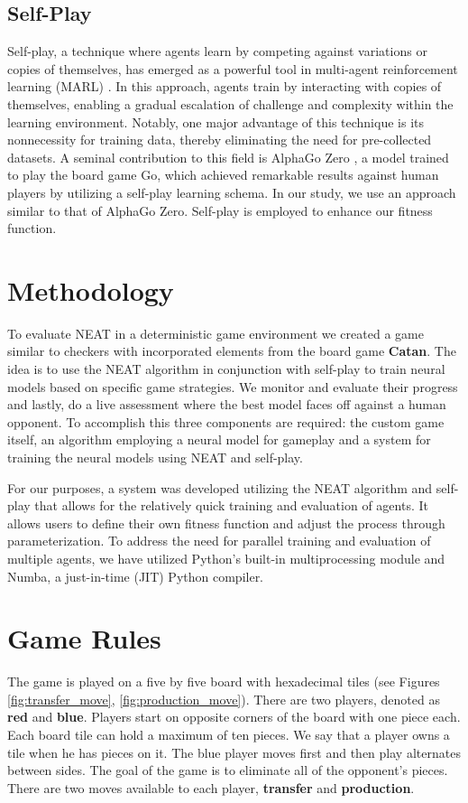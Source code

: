 \documentclass[letterpaper, 12pt]{article}
\begin{document}
\subsection*{Self-Play}
Self-play, a technique where agents learn by competing against variations or copies of
themselves, has emerged as a powerful tool in multi-agent reinforcement learning (MARL)
\cite{5392560}. In this approach, agents train by interacting with copies of themselves,
enabling a gradual escalation of challenge and complexity within the learning
environment. Notably, one major advantage of this technique is its nonnecessity for
training data, thereby eliminating the need for pre-collected datasets. A seminal
contribution to this field is AlphaGo Zero \cite{silver2017mastering}, a model trained
to play the board game Go, which achieved remarkable results against human players by
utilizing a self-play learning schema. In our study, we use an approach similar to that
of AlphaGo Zero. Self-play is employed to enhance our fitness function.

\section*{Methodology}
To evaluate NEAT in a deterministic game environment we created a game similar to
checkers with incorporated elements from the board game \textbf{Catan}. The idea is to
use the NEAT algorithm in conjunction with self-play to train neural models based on
specific game strategies. We monitor and evaluate their progress and lastly, do a live
assessment where the best model faces off against a human opponent. To accomplish this
three components are required: the custom game itself, an algorithm employing a neural
model for gameplay and a system for training the neural models using NEAT and self-play.

For our purposes, a system was developed utilizing the NEAT algorithm and self-play that
allows for the relatively quick training and evaluation of agents. It allows users to
define their own fitness function and adjust the process through parameterization. To
address the need for parallel training and evaluation of multiple agents, we have
utilized Python's built-in multiprocessing module and Numba, a just-in-time (JIT) Python
compiler.

\section*{Game Rules}
The game is played on a five by five board with hexadecimal tiles (see Figures
\ref{fig:transfer_move}, \ref{fig:production_move}). There are two players, denoted as
\textbf{red} and \textbf{blue}. Players start on opposite corners of the board with one
piece each. Each board tile can hold a maximum of ten pieces. We say that a player owns
a tile when he has pieces on it. The blue player moves first and then play alternates
between sides. The goal of the game is to eliminate all of the opponent's pieces. There
are two moves available to each player, \textbf{transfer} and \textbf{production}.
\end{document}
